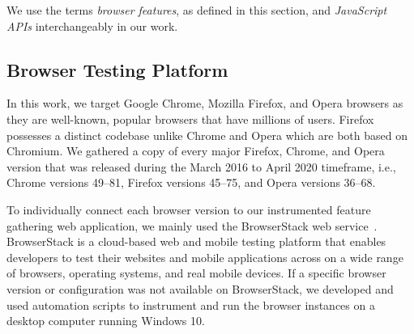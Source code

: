 We use the terms \textit{browser features}, as defined in this section,
and \textit{JavaScript APIs} interchangeably in our work.




\subsection{Browser Testing Platform}

In this work, we target Google Chrome, Mozilla
Firefox, and Opera browsers as they are well-known, popular browsers that have
millions of users. Firefox possesses a distinct codebase unlike Chrome and Opera
which are both based on Chromium. We gathered a copy of every major Firefox, Chrome, and Opera version that was
released during the March 2016 to April 2020 timeframe, i.e., Chrome
versions 49--81, Firefox versions 45--75, and Opera versions 36--68.

To individually connect each browser version to our instrumented
feature gathering web application, we mainly used the BrowserStack web
service~\cite{browserstack}. BrowserStack is a cloud-based web and mobile testing platform
that enables developers to test their websites and mobile applications
across on a wide range of browsers, operating systems, and real mobile
devices. If a specific browser version or configuration was not
available on BrowserStack, we developed and used automation scripts to
instrument and run the browser instances on a desktop computer running
Windows 10.




